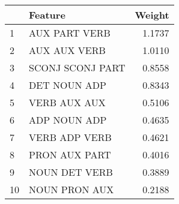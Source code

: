 \begin{tabular}{llr}
\toprule
{} &           Feature &  Weight \\
\midrule
1  &     AUX PART VERB &  1.1737 \\
2  &      AUX AUX VERB &  1.0110 \\
3  &  SCONJ SCONJ PART &  0.8558 \\
4  &      DET NOUN ADP &  0.8343 \\
5  &      VERB AUX AUX &  0.5106 \\
6  &      ADP NOUN ADP &  0.4635 \\
7  &     VERB ADP VERB &  0.4621 \\
8  &     PRON AUX PART &  0.4016 \\
9  &     NOUN DET VERB &  0.3889 \\
10 &     NOUN PRON AUX &  0.2188 \\
\bottomrule
\end{tabular}
